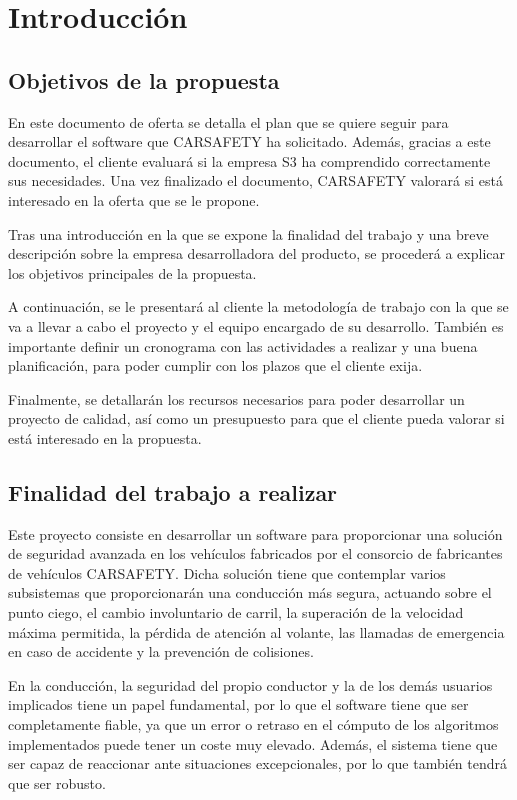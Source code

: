 
\section{Introducción}

\subsection{Objetivos de la propuesta}
\par En este documento de oferta se detalla el plan que se quiere seguir para desarrollar el software que CARSAFETY ha solicitado. Además, gracias a este documento, el cliente evaluará si la empresa S3 ha comprendido correctamente sus necesidades. Una vez finalizado el documento, CARSAFETY valorará si está interesado en la oferta que se le propone.
\par Tras una introducción en la que se expone la finalidad del trabajo y una breve descripción sobre la empresa desarrolladora del producto, se procederá a explicar los objetivos principales de la propuesta.
\par A continuación, se le presentará al cliente la metodología de trabajo con la que se va a llevar a cabo el proyecto y el equipo encargado de su desarrollo. También es importante definir un cronograma con las actividades a realizar y una buena planificación, para poder cumplir con los plazos que el cliente exija.
\par Finalmente, se detallarán los recursos necesarios para poder desarrollar un proyecto de calidad, así como un presupuesto para que el cliente pueda valorar si está interesado en la propuesta.

\subsection{Finalidad del trabajo a realizar}
\par Este proyecto consiste en desarrollar un software para proporcionar una solución de seguridad avanzada en los vehículos fabricados por el consorcio de fabricantes de vehículos CARSAFETY. Dicha solución tiene que contemplar varios subsistemas que proporcionarán una conducción más segura, actuando sobre el punto ciego, el cambio involuntario de carril, la superación de la velocidad máxima permitida, la pérdida de atención al volante, las llamadas de emergencia en caso de accidente y la prevención de colisiones.
\par En la conducción, la seguridad del propio conductor y la de los demás usuarios implicados tiene un papel fundamental, por lo que el software tiene que ser completamente fiable, ya que un error o retraso en el cómputo de los algoritmos implementados puede tener un coste muy elevado. Además, el sistema tiene que ser capaz de reaccionar ante situaciones excepcionales, por lo que también tendrá que ser robusto.

